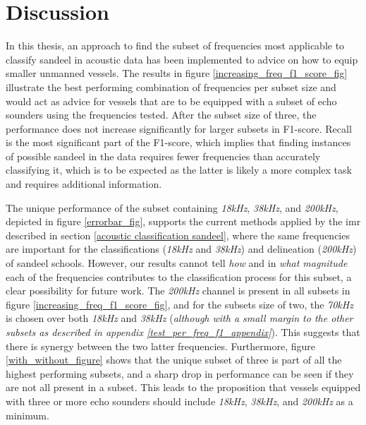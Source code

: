 \chapter{Discussion}
    
    In this thesis, an approach to find the subset of frequencies most applicable to classify sandeel in acoustic data has been implemented to advice on how to equip smaller unmanned vessels. The results in figure  \ref{increasing_freq_f1_score_fig} illustrate the best performing combination of frequencies per subset size and would act as advice for vessels that are to be equipped  with a subset of echo sounders using the frequencies tested. After the subset size of three, the performance does not increase significantly for larger subsets in F1-score. Recall is the most significant part of the F1-score, which implies that finding instances of possible sandeel in the data requires fewer frequencies than accurately classifying it, which is to be expected as the latter is likely a more complex task and requires additional information. 
    
    
    


    The unique performance of the subset containing \textit{18kHz}, \textit{38kHz}, and \textit{200kHz}, depicted in figure \ref{errorbar_fig}, supports the current methods applied by the \gls{imr} described in section \ref{acoustic classification sandeel}, where the same frequencies are important for the classifications (\textit{18kHz} and \textit{38kHz}) and delineation (\textit{200kHz}) of sandeel schools. However, our results cannot tell \textit{how} and in \textit{what magnitude} each of the frequencies contributes to the classification process for this subset, a clear possibility for future work. The \textit{200kHz} channel is present in all subsets in figure \ref{increasing_freq_f1_score_fig}, and for the subsets size of two, the \textit{70kHz}  is chosen over both \textit{18kHz} and \textit{38kHz} (\textit{although with a small margin to the other subsets as described in appendix \ref{test_per_freq_f1_appendix}}). This suggests that there is synergy between the two latter frequencies. Furthermore, figure \ref{with_without_figure} shows that the unique subset of three is part of all the highest performing subsets, and a sharp drop in performance can be seen if they are not all present in a subset. This leads to the proposition that vessels equipped with three or more echo sounders should include \textit{18kHz}, \textit{38kHz}, and \textit{200kHz} as a minimum. 

